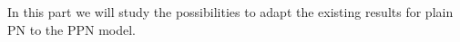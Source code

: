 In this part we will study the possibilities to adapt the existing results for plain \ac{PN} to the \ac{PPN} model.

